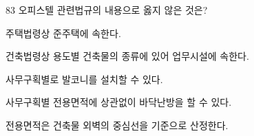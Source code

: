 \begin{question}{83}
오피스텔 관련법규의 내용으로 옳지 않은 것은?
\begin{choices}
  \item 주택법령상 준주택에 속한다.
  \item 건축법령상 용도별 건축물의 종류에 있어 업무시설에 속한다.
  \item 사무구획별로 발코니를 설치할 수 있다.
  \item 사무구획별 전용면적에 상관없이 바닥난방을 할 수 있다.
  \item 전용면적은 건축물 외벽의 중심선을 기준으로 산정한다.
\end{choices}
\end{question}

